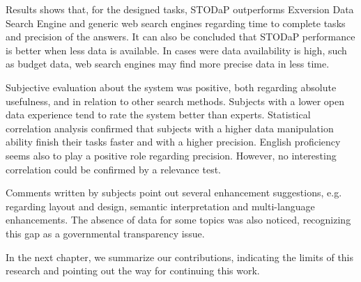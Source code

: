 Results shows that, for the designed tasks, STODaP outperforms Exversion Data Search Engine and generic web search engines regarding time to complete tasks and precision of the answers.
It can also be concluded that STODaP performance is better when less data is available.
In cases were data availability is high, such as budget data, web search engines may find more precise data in less time.

Subjective evaluation about the system was positive, both regarding absolute usefulness, and in relation to other search methods.
Subjects with a lower open data experience tend to rate the system better than experts.
Statistical correlation analysis confirmed that subjects with a higher data manipulation ability finish their tasks faster and with a higher precision.
English proficiency seems also to play a positive role regarding precision.
However, no interesting correlation could be confirmed by a relevance test.

Comments written by subjects point out several enhancement suggestions, e.g. regarding layout and design, semantic interpretation and multi-language enhancements.
The absence of data for some topics was also noticed, recognizing this gap as a governmental transparency issue.

In the next chapter, we summarize our contributions, indicating the limits of this research and pointing out the way for continuing this work.